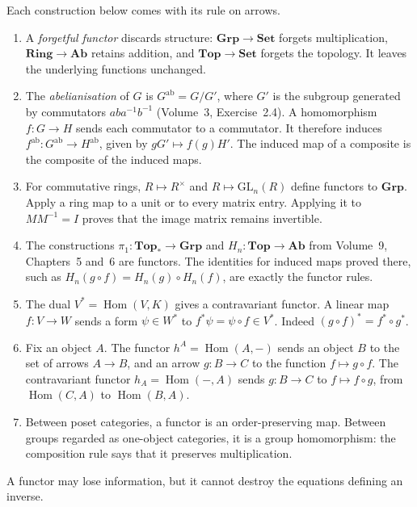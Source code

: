 \begin{example}\label{ex:functors}
Each construction below comes with its rule on arrows.
\begin{enumerate}[label=(\alph*)]
\item A \emph{forgetful functor} discards structure: $\mathbf{Grp}\to\mathbf{Set}$ forgets multiplication, $\mathbf{Ring}\to\mathbf{Ab}$ retains addition, and $\mathbf{Top}\to\mathbf{Set}$ forgets the topology. It leaves the underlying functions unchanged.
\item The \emph{abelianisation} of $G$ is $G^{\mathrm{ab}}=G/G'$, where $G'$ is the subgroup generated by commutators $aba^{-1}b^{-1}$ (Volume~3, Exercise~2.4). A homomorphism $f:G\to H$ sends each commutator to a commutator. It therefore induces $f^{\mathrm{ab}}:G^{\mathrm{ab}}\to H^{\mathrm{ab}}$, given by $gG'\mapsto f(g)H'$. The induced map of a composite is the composite of the induced maps.
\item For commutative rings, $R\mapsto R^\times$ and $R\mapsto\mathrm{GL}_n(R)$ define functors to $\mathbf{Grp}$. Apply a ring map to a unit or to every matrix entry. Applying it to $MM^{-1}=I$ proves that the image matrix remains invertible.
\item The constructions $\pi_1:\mathbf{Top}_*\to\mathbf{Grp}$ and $H_n:\mathbf{Top}\to\mathbf{Ab}$ from Volume~9, Chapters~5 and~6 are functors. The identities for induced maps proved there, such as $H_n(g\circ f)=H_n(g)\circ H_n(f)$, are exactly the functor rules.
\item The dual $V^*=\operatorname{Hom}(V,K)$ gives a contravariant functor. A linear map $f:V\to W$ sends a form $\psi\in W^*$ to $f^*\psi=\psi\circ f\in V^*$. Indeed $(g\circ f)^*=f^*\circ g^*$.
\item Fix an object $A$. The functor $h^A=\operatorname{Hom}(A,-)$ sends an object $B$ to the set of arrows $A\to B$, and an arrow $g:B\to C$ to the function $f\mapsto g\circ f$. The contravariant functor $h_A=\operatorname{Hom}(-,A)$ sends $g:B\to C$ to $f\mapsto f\circ g$, from $\operatorname{Hom}(C,A)$ to $\operatorname{Hom}(B,A)$.
\item Between poset categories, a functor is an order-preserving map. Between groups regarded as one-object categories, it is a group homomorphism: the composition rule says that it preserves multiplication.
\end{enumerate}
\end{example}

A functor may lose information, but it cannot destroy the equations defining an inverse.

